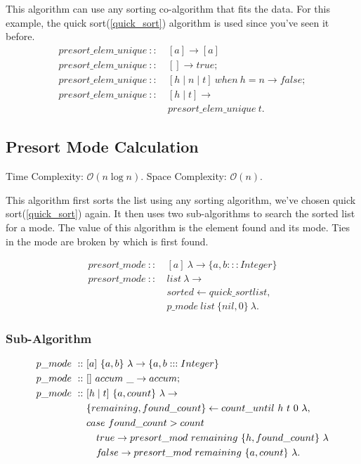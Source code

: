 \documentclass[a4paper,10pt]{book}
\newcommand{\false}{f\kern-0.25ex{alse}}
\begin{document}
This algorithm can use any sorting co-algorithm that fits the data. For this example, the quick sort(\ref{quick_sort}) algorithm is used since you've seen it before.
\begin{align*}
presort\_elem\_unique\ ::\ & [a]\rightarrow [a]\\
presort\_elem\_unique\ ::\ &[]\rightarrow true;\\
presort\_elem\_unique\ ::\ &[h\mid n\mid t]\ when\ h=n\rightarrow false;\\
presort\_elem\_unique\ ::\ &[h\mid t]\rightarrow\\
	&presort\_elem\_unique\ t.
\end{align*}
\subsection{Presort Mode Calculation} Time Complexity: $\mathcal{O}(n\log n)$. Space Complexity: $\mathcal{O}(n)$.

This algorithm first sorts the list using any sorting algorithm, we've chosen quick sort(\ref{quick_sort}) again. It then uses two sub-algorithms to search the sorted list for a mode. The value of this algorithm is the element found and its mode. Ties in the mode are broken by which is first found.

\begin{align*}
presort\_mode\ ::\ &[a]\ \lambda\rightarrow \{a,b:::Integer\}\\
presort\_mode\ ::\ &list\ \lambda\rightarrow\\
	&sorted\leftarrow quick\_sort list,\\
	&p\_mode\ list\ \{nil,0\}\ \lambda.
\end{align*}

\subsubsection{Sub-Algorithm}

\begin{align*}
p\_mode\ ::\ &[a]\ \{a,b\}\ \lambda\rightarrow \{a,b:::Integer\}\\
p\_mode\ ::\ &[]\ accum\ \_\rightarrow accum;\\
p\_mode\ ::\ &[h\mid t]\ \{a,count\}\ \lambda\rightarrow\\
	&\{remaining,found\_count\}\leftarrow count\_until\ h\ t\ 0\ \lambda,\\
	&case\ found\_count > count\\
	&\quad true\rightarrow presort\_mod\ remaining\ \{h,found\_count\}\ \lambda\\
	&\quad\false\rightarrow presort\_mod\ remaining\ \{a,count\}\ \lambda.
\end{align*}
\end{document}
